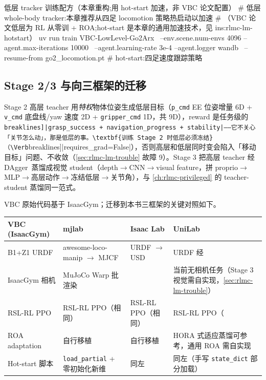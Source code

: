 \begin{codebox}[bash]{低层 tracker 训练配方（本章重构;用 hot-start 加速，非 VBC 论文配置）}
# 低层 whole-body tracker:本章推荐从四足 locomotion 策略热启动以加速
#   （VBC 论文低层为 RL 从零训 + ROA;hot-start 是本章的通用加速技术，见 ins:rlmc-lm-hotstart）
uv run train VBC-LowLevel-Go2Arx \
  --env.scene.num-envs 4096 --agent.max-iterations 10000 \
  --agent.learning-rate 3e-4 --agent.logger wandb \
  --resume-from go2_locomotion.pt          # hot-start:四足速度跟踪策略
\end{codebox}

\subsection{Stage 2/3 与向三框架的迁移}
\label{sec:rlmc-lm-vbc-migrate}

Stage 2 高层 teacher 用\emph{特权}物体位姿生成低层目标（\verb|p_cmd| EE 位姿增量 6D + \verb|v_cmd| 底盘线/yaw 速度 2D + \verb|gripper_cmd| 1D，共 9D），reward 是任务级的 \Verb[breaklines]|grasp_success + navigation_progress + stability|——它不关心「关节怎么动」，那是低层的事。\textbf{训练 Stage 2 时低层必须冻结}（\Verb[breaklines]|requires_grad=False|），否则高层和低层同时变会陷入「移动目标」问题、不收敛（\cref{sec:rlmc-lm-trouble} 故障 9）。Stage 3 把高层 teacher 经 DAgger\,\cite{ross2011dagger} 蒸馏成视觉 student（depth$\to$CNN$\to$visual feature，拼 proprio$\to$MLP$\to$高层动作$\to$冻结低层$\to$关节角），与 \cref{ch:rlmc-privileged} 的 teacher-student 蒸馏同一范式。

VBC 原始代码基于 IsaacGym；迁移到本书三框架的关键对照如下。

\begin{center}
\small
\begin{tabular}{@{}p{3.0cm}p{3.4cm}p{3.4cm}p{3.6cm}@{}}
\toprule
VBC (IsaacGym) & mjlab & Isaac Lab & UniLab \\
\midrule
B1+Z1 URDF & awesome-loco-manip $\to$ MJCF & URDF $\to$ USD & URDF 经 \Verb[breaklines]|unilab-import-robot| $\to$ MJCF \\
IsaacGym 相机 & MuJoCo Warp 批渲染 & \Verb[breaklines]|TiledCameraCfg| & 当前无相机任务（Stage 3 视觉需自实现，\cref{sec:rlmc-lm-trouble}） \\
RSL-RL PPO & RSL-RL PPO（相同） & RSL-RL PPO（相同） & RSL-RL PPO（\Verb[breaklines]|FinalObservationAwarePPO|）\\
ROA adaptation & 自行移植 & 自行移植 & HORA 式适应蒸馏可参考，通用 ROA 需自实现 \\
Hot-start 脚本 & \verb|load_partial| + 零初始化新维 & 同左 & 同左（手写 \verb|state_dict| 部分加载）\\
\bottomrule
\end{tabular}
\end{center}

